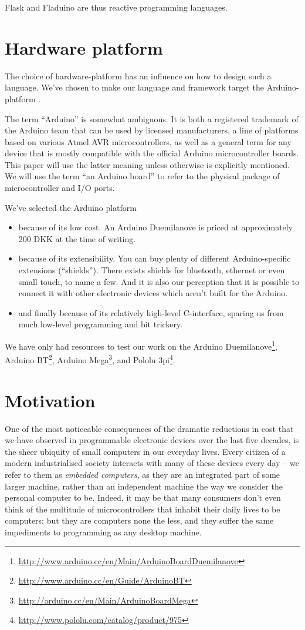 \documentclass[a4paper, oneside, final]{memoir}
\begin{document}
Flask and Fladuino are thus reactive programming languages.


\section{Hardware platform}
\label{sec:hardware platform}
The choice of hardware-platform has an influence on how to design such
a language. We've chosen to make our language and framework target the
Arduino-platform \cite{arduino}.

The term ``Arduino'' is somewhat ambiguous.  It is both a registered
trademark of the Arduino team that can be used by licensed
manufacturers, a line of platforms based on various Atmel AVR
microcontrollers, as well as a general term for any device that is
mostly compatible with the official Arduino microcontroller boards.
This paper will use the latter meaning unless otherwise is explicitly
mentioned.  We will use the term ``an Arduino board'' to refer to the
physical package of microcontroller and I/O ports.

\noindent
We've selected the Arduino platform 
\begin{itemize}
\item because of its low cost. An Arduino Duemilanove is priced at
  approximately 200 \nolinebreak DKK at the time of writing.
\item because of its extensibility. You can buy plenty of different
  Arduino-specific extensions (``shields''). There exists shields for
  bluetooth, ethernet or even small touch, to name a few. And it is also
  our perception that it is possible to connect it with other
  electronic devices which aren't built for the Arduino.
\item and finally because of its relatively high-level C-interface,
  sparing us from much low-level programming and bit trickery.
\end{itemize}

We have only had resources to test our work on the Arduino
Duemilanove\footnote{\url{http://www.arduino.cc/en/Main/ArduinoBoardDuemilanove}},
Arduino BT\footnote{\url{http://www.arduino.cc/en/Guide/ArduinoBT}},
Arduino
Mega\footnote{\url{http://arduino.cc/en/Main/ArduinoBoardMega}}, and
Pololu 3pi\footnote{\url{http://www.pololu.com/catalog/product/975}}.

\section{Motivation}
One of the most noticeable consequences of the dramatic reductions in
cost that we have observed in programmable electronic devices over the
last five decades, is the sheer ubiquity of small computers in our
everyday lives.  Every citizen of a modern industrialised society
interacts with many of these devices every day -- we refer to them as
\textit{embedded computers}, as they are an integrated part of some
larger machine, rather than an independent machine the way we consider
the personal computer to be.  Indeed, it may be that many consumers
don't even think of the multitude of microcontrollers that inhabit
their daily lives to be computers; but they are computers none the
less, and they suffer the same impediments to programming as any
desktop machine.
\end{document}
